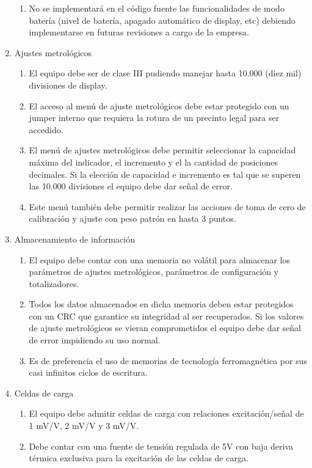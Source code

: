 \documentclass[11pt]{charter}
\begin{document}
\begin{enumerate}
\begin{enumerate}
	\item No se implementará en el código fuente las funcionalidades de modo batería (nivel de batería, apagado automático de display, etc) debiendo implementarse en futuras revisiones a cargo de la empresa. 
	\end{enumerate}
\item Ajustes metrológicos
	\begin{enumerate}
	\item El equipo debe ser de clase III pudiendo manejar hasta 10.000 (diez mil) divisiones de display.
	\item El acceso al menú de ajuste metrológicos debe estar protegido con un jumper interno que requiera la rotura de un precinto legal para ser accedido. 
	\item El menú de ajustes metrológicos debe permitir seleccionar la capacidad máxima del indicador, el incremento y el la cantidad de posiciones decimales. Si la elección de capacidad e incremento es tal que se superen las 10.000 divisiones el equipo debe dar señal de error.
	\item Este menú también debe permitir realizar las acciones de toma de cero de calibración y ajuste con peso patrón en hasta 3 puntos.
	\end{enumerate}
\item Almacenamiento de información
	\begin{enumerate}
	\item El equipo debe contar con una memoria no volátil para almacenar los parámetros de ajustes metrológicos, parámetros de configuración y totalizadores. 
	\item Todos los datos almacenados en dicha memoria deben estar protegidos con un CRC que garantice su integridad al ser recuperados. Si los valores de ajuste metrológicos se vieran comprometidos el equipo debe dar señal de error impidiendo su uso normal.
	\item Es de preferencia el uso de memorias de tecnología ferromagnética por sus casi infinitos ciclos de escritura. 
	\end{enumerate}	
\item Celdas de carga
	\begin{enumerate}
	\item El equipo debe admitir celdas de carga con relaciones excitación/señal de 1 mV/V, 2 mV/V y 3 mV/V.
	\item Debe contar con una fuente de tensión regulada de 5V con baja deriva térmica exclusiva para la excitación de las celdas de carga.

\end{enumerate}
\end{enumerate}
\end{document}
